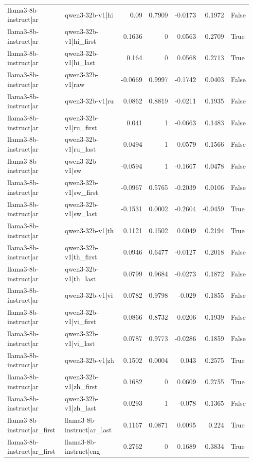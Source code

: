 \begin{table}
\begin{tabular}{l l r r r r l}
llama3-8b-instruct|ar & qwen3-32b-v1|hi & 0.09 & 0.7909 & -0.0173 & 0.1972 & False \\
llama3-8b-instruct|ar & qwen3-32b-v1|hi_first & 0.1636 & 0 & 0.0563 & 0.2709 & True \\
llama3-8b-instruct|ar & qwen3-32b-v1|hi_last & 0.164 & 0 & 0.0568 & 0.2713 & True \\
llama3-8b-instruct|ar & qwen3-32b-v1|raw & -0.0669 & 0.9997 & -0.1742 & 0.0403 & False \\
llama3-8b-instruct|ar & qwen3-32b-v1|ru & 0.0862 & 0.8819 & -0.0211 & 0.1935 & False \\
llama3-8b-instruct|ar & qwen3-32b-v1|ru_first & 0.041 & 1 & -0.0663 & 0.1483 & False \\
llama3-8b-instruct|ar & qwen3-32b-v1|ru_last & 0.0494 & 1 & -0.0579 & 0.1566 & False \\
llama3-8b-instruct|ar & qwen3-32b-v1|sw & -0.0594 & 1 & -0.1667 & 0.0478 & False \\
llama3-8b-instruct|ar & qwen3-32b-v1|sw_first & -0.0967 & 0.5765 & -0.2039 & 0.0106 & False \\
llama3-8b-instruct|ar & qwen3-32b-v1|sw_last & -0.1531 & 0.0002 & -0.2604 & -0.0459 & True \\
llama3-8b-instruct|ar & qwen3-32b-v1|th & 0.1121 & 0.1502 & 0.0049 & 0.2194 & True \\
llama3-8b-instruct|ar & qwen3-32b-v1|th_first & 0.0946 & 0.6477 & -0.0127 & 0.2018 & False \\
llama3-8b-instruct|ar & qwen3-32b-v1|th_last & 0.0799 & 0.9684 & -0.0273 & 0.1872 & False \\
llama3-8b-instruct|ar & qwen3-32b-v1|vi & 0.0782 & 0.9798 & -0.029 & 0.1855 & False \\
llama3-8b-instruct|ar & qwen3-32b-v1|vi_first & 0.0866 & 0.8732 & -0.0206 & 0.1939 & False \\
llama3-8b-instruct|ar & qwen3-32b-v1|vi_last & 0.0787 & 0.9773 & -0.0286 & 0.1859 & False \\
llama3-8b-instruct|ar & qwen3-32b-v1|zh & 0.1502 & 0.0004 & 0.043 & 0.2575 & True \\
llama3-8b-instruct|ar & qwen3-32b-v1|zh_first & 0.1682 & 0 & 0.0609 & 0.2755 & True \\
llama3-8b-instruct|ar & qwen3-32b-v1|zh_last & 0.0293 & 1 & -0.078 & 0.1365 & False \\
llama3-8b-instruct|ar_first & llama3-8b-instruct|ar_last & 0.1167 & 0.0871 & 0.0095 & 0.224 & True \\
llama3-8b-instruct|ar_first & llama3-8b-instruct|eng & 0.2762 & 0 & 0.1689 & 0.3834 & True \\

\end{tabular}
\end{table}
